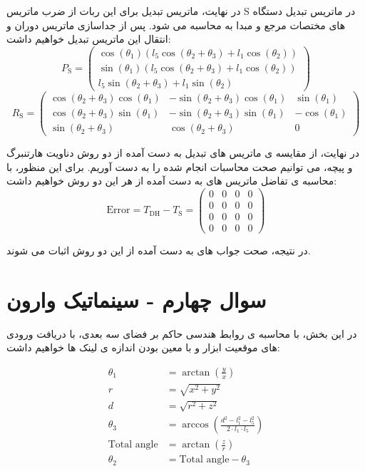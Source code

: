 \documentclass{article}
\begin{document}
در نهایت، ماتریس تبدیل برای این ربات از ضرب ماتریس S
در ماتریس تبدیل دستگاه های مختصات مرجع و مبدا به محاسبه می شود. پس از جداسازی ماتریس دوران و انتقال این ماتریس تبدیل خواهیم داشت:
\[
P_{\text{S}} = 
\begin{pmatrix}
\cos \left(\theta_1 \right) \left(l_5 \cos \left(\theta_2 + \theta_3 \right) + l_1 \cos \left(\theta_2 \right)\right) \\
\sin \left(\theta_1 \right) \left(l_5 \cos \left(\theta_2 + \theta_3 \right) + l_1 \cos \left(\theta_2 \right)\right) \\
l_5 \sin \left(\theta_2 + \theta_3 \right) + l_1 \sin \left(\theta_2 \right)
\end{pmatrix}
\]
\[
R_{\text{S}} = 
\begin{pmatrix}
\cos \left(\theta_2 + \theta_3 \right) \cos \left(\theta_1 \right) & -\sin \left(\theta_2 + \theta_3 \right) \cos \left(\theta_1 \right) & \sin \left(\theta_1 \right) \\
\cos \left(\theta_2 + \theta_3 \right) \sin \left(\theta_1 \right) & -\sin \left(\theta_2 + \theta_3 \right) \sin \left(\theta_1 \right) & -\cos \left(\theta_1 \right) \\
\sin \left(\theta_2 + \theta_3 \right) & \cos \left(\theta_2 + \theta_3 \right) & 0
\end{pmatrix}
\]

در نهایت، از مقایسه ی ماتریس های تبدیل به دست آمده از دو روش دناویت هارتنبرگ و پیچه، می توانیم صحت محاسبات انجام شده را به دست آوریم. برای این منظور، با محاسبه ی تفاضل ماتریس های به دست آمده از هر این دو روش خواهیم داشت:
\[
\text{Error} = T_{\text{DH}} - T_{\text{S}} = 
\begin{pmatrix}
0 & 0 & 0 & 0 \\
0 & 0 & 0 & 0 \\
0 & 0 & 0 & 0 \\
0 & 0 & 0 & 0
\end{pmatrix}
\]

در نتیجه، صحت جواب های به دست آمده از این دو روش اثبات می شوند.

\section{سوال چهارم - سینماتیک وارون}\label{Section4}

در این بخش، با محاسبه ی روابط هندسی حاکم بر فضای سه بعدی، با دریافت ورودی های موقعیت ابزار و با معین بودن اندازه ی لینک ها خواهیم داشت:

\begin{align*}
    \theta_1 &= \arctan\left(\frac{y}{x}\right) \\
    r &= \sqrt{x^2 + y^2} \\
    d &= \sqrt{r^2 + z^2} \\
    \theta_3 &= \arccos\left(\frac{d^2 - l_1^2 - l_5^2}{2 \cdot l_1 \cdot l_5}\right) \\
    \text{Total angle} &= \arctan\left(\frac{z}{r}\right) \\
    \theta_2 &= \text{Total angle} - \theta_3
\end{align*}
\end{document}
